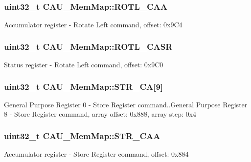 \subsubsection[{R\+O\+T\+L\+\_\+\+C\+A\+A}]{\setlength{\rightskip}{0pt plus 5cm}uint32\+\_\+t C\+A\+U\+\_\+\+Mem\+Map\+::\+R\+O\+T\+L\+\_\+\+C\+A\+A}\label{struct_c_a_u___mem_map_a512db0326bf0cfd6896ddb5ee85d76ee}
Accumulator register -\/ Rotate Left command, offset\+: 0x9\+C4 \hypertarget{struct_c_a_u___mem_map_a32dbbd85f3b4630c96083416bf2a8255}{}
\subsubsection[{R\+O\+T\+L\+\_\+\+C\+A\+S\+R}]{\setlength{\rightskip}{0pt plus 5cm}uint32\+\_\+t C\+A\+U\+\_\+\+Mem\+Map\+::\+R\+O\+T\+L\+\_\+\+C\+A\+S\+R}\label{struct_c_a_u___mem_map_a32dbbd85f3b4630c96083416bf2a8255}
Status register -\/ Rotate Left command, offset\+: 0x9\+C0 \hypertarget{struct_c_a_u___mem_map_a52fa9a2cc14dede00bf01a39590a757d}{}
\subsubsection[{S\+T\+R\+\_\+\+C\+A}]{\setlength{\rightskip}{0pt plus 5cm}uint32\+\_\+t C\+A\+U\+\_\+\+Mem\+Map\+::\+S\+T\+R\+\_\+\+C\+A\mbox{[}9\mbox{]}}\label{struct_c_a_u___mem_map_a52fa9a2cc14dede00bf01a39590a757d}
General Purpose Register 0 -\/ Store Register command..General Purpose Register 8 -\/ Store Register command, array offset\+: 0x888, array step\+: 0x4 \hypertarget{struct_c_a_u___mem_map_aa67e4616f37a59b89df13691bf40f643}{}
\subsubsection[{S\+T\+R\+\_\+\+C\+A\+A}]{\setlength{\rightskip}{0pt plus 5cm}uint32\+\_\+t C\+A\+U\+\_\+\+Mem\+Map\+::\+S\+T\+R\+\_\+\+C\+A\+A}\label{struct_c_a_u___mem_map_aa67e4616f37a59b89df13691bf40f643}
Accumulator register -\/ Store Register command, offset\+: 0x884 \hypertarget{struct_c_a_u___mem_map_ad90eef15bc61290af107c3d5871599a8}{}
